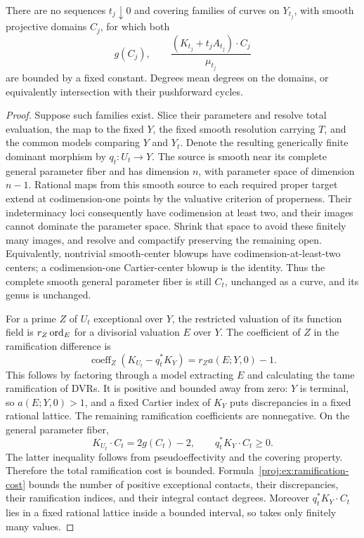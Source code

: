 \begin{proposition}\label{proj:prop:bounded-curves}
There are no sequences \(t_j\downarrow0\) and covering
families of curves on \(Y_{t_j}\), with smooth projective
domains \(C_j\), for which both
\[
 g(C_j),\qquad
 \frac{(K_{t_j}+t_jA_{t_j})\cdot C_j}{\mu_{t_j}}
\]
are bounded by a fixed constant. Degrees mean degrees on
the domains, or equivalently intersection with their
pushforward cycles.
\end{proposition}
\begin{proof}
Suppose such families exist. Slice their parameters and
resolve total evaluation, the map to the fixed \(Y\), the
fixed smooth resolution carrying \(T\), and the common
models comparing \(Y\) and \(Y_t\). Denote the resulting
generically finite dominant morphism by \(q_t:U_t\to Y\).
The source is smooth near its complete general parameter
fiber and has dimension \(n\), with parameter space of
dimension \(n-1\). Rational maps from this smooth source
to each required proper target extend at codimension-one
points by the valuative criterion of properness. Their
indeterminacy loci consequently have codimension at least
two, and their images cannot dominate the parameter space.
Shrink that space to avoid these finitely many images,
and resolve and compactify preserving the remaining open.
Equivalently, nontrivial smooth-center blowups have
codimension-at-least-two centers; a codimension-one
Cartier-center blowup is the identity. Thus the complete
smooth general parameter fiber is still \(C_t\), unchanged
as a curve, and its genus is unchanged.

For a prime \(Z\) of \(U_t\) exceptional over \(Y\), the
restricted valuation of its function field is
\(r_Z\operatorname{ord}_E\) for a divisorial valuation \(E\) over \(Y\).
The coefficient of \(Z\) in the ramification difference is
\begin{equation}\label{proj:ex:ramification-cost}
 \operatorname{coeff}_Z(K_{U_t}-q_t^*K_Y)
       =r_Za(E;Y,0)-1.
\end{equation}
This follows by factoring through a model extracting \(E\)
and calculating the tame ramification of DVRs. It is
positive and bounded away from zero: \(Y\) is terminal,
so \(a(E;Y,0)>1\), and a fixed Cartier index of \(K_Y\)
puts discrepancies in a fixed rational lattice. The
remaining ramification coefficients are nonnegative.
On the general parameter fiber,
\[
 K_{U_t}\cdot C_t=2g(C_t)-2,\qquad
 q_t^*K_Y\cdot C_t\geq0.
 \]
The latter inequality follows from pseudoeffectivity and
the covering property. Therefore the total ramification
cost is bounded. Formula~\eqref{proj:ex:ramification-cost}
bounds the number of positive exceptional contacts,
their discrepancies, their ramification indices, and
their integral contact degrees. Moreover
\(q_t^*K_Y\cdot C_t\) lies in a fixed rational lattice
inside a bounded interval, so takes only finitely many
values.


\end{proof}

